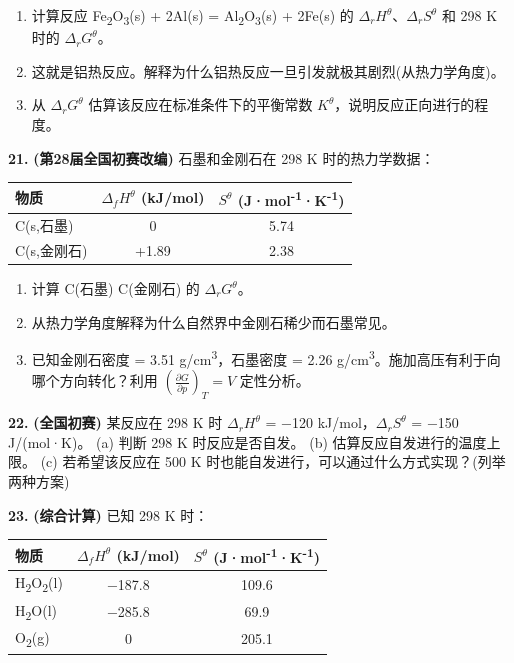 \begin{enumerate}
\def\labelenumi{(\alph{enumi})}
\tightlist
\item
  计算反应 Fe\textsubscript{2}O\textsubscript{3}(s) + 2Al(s) = Al\textsubscript{2}O\textsubscript{3}(s) + 2Fe(s) 的 \(\Delta_r H^\theta\)、\(\Delta_r S^\theta\) 和 298 K 时的 \(\Delta_r G^\theta\)。
\item
  这就是铝热反应。解释为什么铝热反应一旦引发就极其剧烈(从热力学角度)。
\item
  从 \(\Delta_r G^\theta\) 估算该反应在标准条件下的平衡常数 \(K^\theta\)，说明反应正向进行的程度。
\end{enumerate}

\textbf{21.} \textbf{(第28届全国初赛改编)} 石墨和金刚石在 298 K 时的热力学数据：

{\def\LTcaptype{none} %
\begin{longtable}[]{@{}lcc@{}}
\toprule\noalign{}
物质 & \(\Delta_f H^\theta\) (kJ/mol) & \(S^\theta\) (J·mol\textsuperscript{-1}·K\textsuperscript{-1}) \\
\midrule\noalign{}
\endhead
\bottomrule\noalign{}
\endlastfoot
C(s,石墨) & 0 & 5.74 \\
C(s,金刚石) & +1.89 & 2.38 \\
\end{longtable}
}

\begin{enumerate}
\def\labelenumi{(\alph{enumi})}
\tightlist
\item
  计算 C(石墨) \箭 C(金刚石) 的 \(\Delta_r G^\theta\)。
\item
  从热力学角度解释为什么自然界中金刚石稀少而石墨常见。
\item
  已知金刚石密度 = 3.51 g/cm\textsuperscript{3}，石墨密度 = 2.26 g/cm\textsuperscript{3}。施加高压有利于向哪个方向转化？利用 \(\left(\frac{\partial G}{\partial p}\right)_T = V\) 定性分析。
\end{enumerate}

\textbf{22.} \textbf{(全国初赛)} 某反应在 298 K 时 \(\Delta_r H^\theta\) = −120 kJ/mol，\(\Delta_r S^\theta\) = −150 J/(mol·K)。
(a) 判断 298 K 时反应是否自发。
(b) 估算反应自发进行的温度上限。
(c) 若希望该反应在 500 K 时也能自发进行，可以通过什么方式实现？(列举两种方案)

\textbf{23.} \textbf{(综合计算)} 已知 298 K 时：

{\def\LTcaptype{none} %
\begin{longtable}[]{@{}lcc@{}}
\toprule\noalign{}
物质 & \(\Delta_f H^\theta\) (kJ/mol) & \(S^\theta\) (J·mol\textsuperscript{-1}·K\textsuperscript{-1}) \\
\midrule\noalign{}
\endhead
\bottomrule\noalign{}
\endlastfoot
H\textsubscript{2}O\textsubscript{2}(l) & −187.8 & 109.6 \\
H\textsubscript{2}O(l) & −285.8 & 69.9 \\
O\textsubscript{2}(g) & 0 & 205.1 \\
\end{longtable}
}

